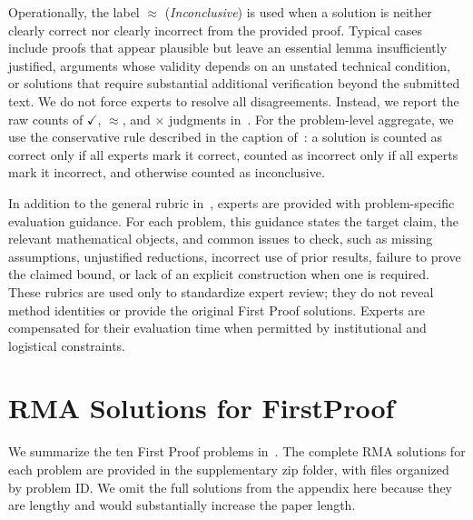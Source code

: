\documentclass{article}
\newcommand{\modelname}{\textsc{RMA}\xspace}
\begin{document}
Operationally, the label $\approx$ (\emph{Inconclusive}) is used when a solution is neither clearly correct nor clearly incorrect from the provided proof. Typical cases include proofs that appear plausible but leave an essential lemma insufficiently justified, arguments whose validity depends on an unstated technical condition, or solutions that require substantial additional verification beyond the submitted text. We do not force experts to resolve all disagreements. Instead, we report the raw counts of $\checkmark$, $\approx$, and $\times$ judgments in~. For the problem-level aggregate, we use the conservative rule described in the caption of~: a solution is counted as correct only if all experts mark it correct, counted as incorrect only if all experts mark it incorrect, and otherwise counted as inconclusive.

In addition to the general rubric in~, experts are provided with problem-specific evaluation guidance. For each problem, this guidance states the target claim, the relevant mathematical objects, and common issues to check, such as missing assumptions, unjustified reductions, incorrect use of prior results, failure to prove the claimed bound, or lack of an explicit construction when one is required. These rubrics are used only to standardize expert review; they do not reveal method identities or provide the original First Proof solutions. Experts are compensated for their evaluation time when permitted by institutional and logistical constraints.
\section{\modelname Solutions for FirstProof}
\label{app-all-solutions}
We summarize the ten First Proof problems in~. The complete \modelname solutions for each problem are provided in the supplementary zip folder, with files organized by problem ID. We omit the full solutions from the appendix here because they are lengthy and would substantially increase the paper length.
\end{document}

